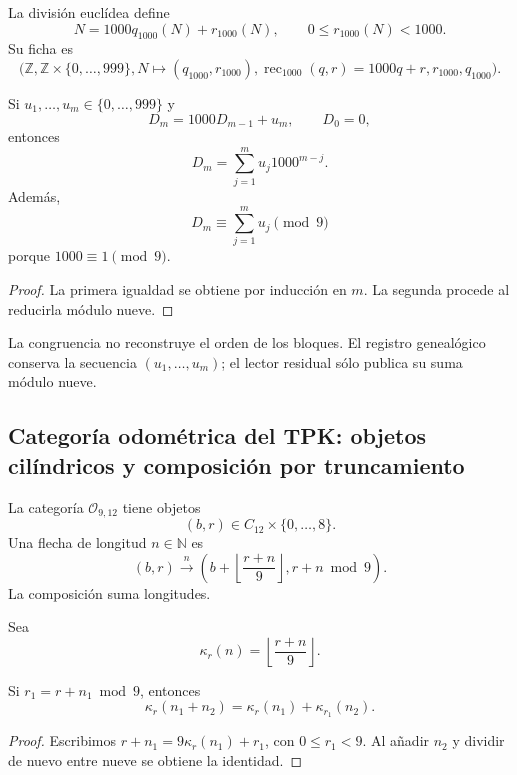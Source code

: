 La división euclídea define
\[
 N=1000q_{1000}(N)+r_{1000}(N),
 \qquad 0\leq r_{1000}(N)<1000.
\]
Su ficha es
\[
 \bigl(
 \mathbb Z,\mathbb Z\times\{0,\ldots,999\},
 N\mapsto(q_{1000},r_{1000}),
 \operatorname{rec}_{1000}(q,r)=1000q+r,
 r_{1000},
 q_{1000}
 \bigr).
\]

\begin{proposition}
\label{p12-83-c1-s13:prop:tpk-concatenacion-base-mil}
Si \(u_1,\ldots,u_m\in\{0,\ldots,999\}\) y
\[
 D_m=1000D_{m-1}+u_m,
 \qquad D_0=0,
\]
entonces
\[
 D_m=\sum_{j=1}^m u_j1000^{m-j}.
\]
Además,
\[
 D_m\equiv\sum_{j=1}^m u_j\pmod9
\]
porque \(1000\equiv1\pmod9\).
\end{proposition}

\begin{proof}
La primera igualdad se obtiene por inducción en \(m\). La segunda procede
al reducirla módulo nueve.
\end{proof}

La congruencia no reconstruye el orden de los bloques. El registro genealógico conserva la
secuencia \((u_1,\ldots,u_m)\); el lector residual sólo publica su suma
módulo nueve.

\subsection{Categoría odométrica del TPK: objetos cilíndricos y composición por truncamiento}

\begin{definition}
\label{p12-83-c1-s13:def:tpk-odometro-9-12}
La categoría \(\mathcal O_{9,12}\) tiene objetos
\[
 (b,r)\in C_{12}\times\{0,\ldots,8\}.
\]
Una flecha de longitud \(n\in\mathbb N\) es
\[
 (b,r)\xrightarrow{\ n\ }
 \left(
  b+\left\lfloor\frac{r+n}{9}\right\rfloor,
  r+n\bmod9
 \right).
\]
La composición suma longitudes.
\end{definition}

Sea
\[
 \kappa_r(n)=\left\lfloor\frac{r+n}{9}\right\rfloor.
\]

\begin{lemma}
\label{p12-83-c1-s13:lem:tpk-cociclo-odometro}
Si \(r_1=r+n_1\bmod9\), entonces
\[
 \kappa_r(n_1+n_2)
 =\kappa_r(n_1)+\kappa_{r_1}(n_2).
\]
\end{lemma}

\begin{proof}
Escribimos \(r+n_1=9\kappa_r(n_1)+r_1\), con
\(0\leq r_1<9\). Al añadir \(n_2\) y dividir de nuevo entre nueve se
obtiene la identidad.
\end{proof}


